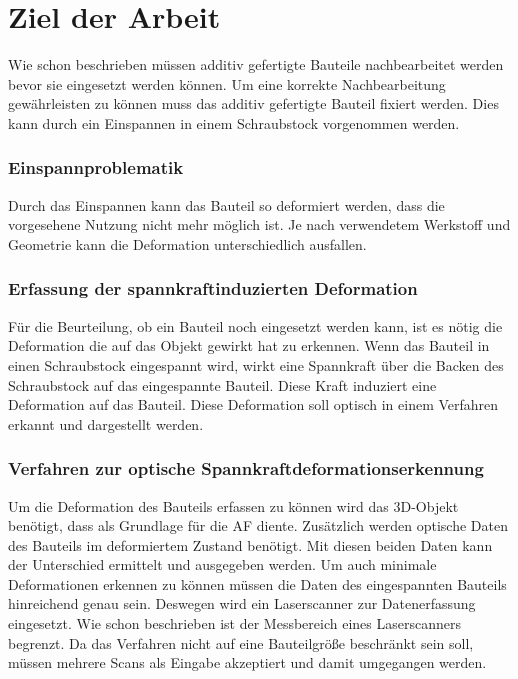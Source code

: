 

\chapter{Ziel der Arbeit}

Wie schon beschrieben müssen additiv gefertigte Bauteile nachbearbeitet werden
bevor sie eingesetzt werden können. 
Um eine korrekte Nachbearbeitung gewährleisten zu können muss das additiv 
gefertigte Bauteil fixiert werden. Dies kann durch ein Einspannen in einem 
Schraubstock vorgenommen werden. 

\subsection{Einspannproblematik}

Durch das Einspannen kann das Bauteil so deformiert werden, dass die vorgesehene Nutzung nicht mehr möglich ist. 
Je nach verwendetem Werkstoff und Geometrie kann die Deformation unterschiedlich
ausfallen. 

\subsection{Erfassung der spannkraftinduzierten Deformation}

Für die Beurteilung, ob ein Bauteil noch eingesetzt werden kann, ist es nötig die 
Deformation die auf das Objekt gewirkt hat zu erkennen. Wenn das Bauteil in einen 
Schraubstock eingespannt wird, wirkt eine Spannkraft über die Backen des Schraubstock
auf das eingespannte Bauteil. 
Diese Kraft induziert eine Deformation auf das Bauteil. Diese Deformation soll 
optisch in einem Verfahren erkannt und dargestellt werden.

\subsection{Verfahren zur optische Spannkraftdeformationserkennung}

Um die Deformation des Bauteils erfassen zu können wird das 3D-Objekt benötigt, 
dass als Grundlage für die AF diente. Zusätzlich werden optische Daten des Bauteils 
im deformiertem Zustand benötigt. Mit diesen beiden Daten kann der Unterschied 
ermittelt und ausgegeben werden.
Um auch minimale Deformationen erkennen zu können müssen die Daten des 
eingespannten Bauteils hinreichend genau sein. Deswegen wird ein Laserscanner zur 
Datenerfassung eingesetzt.
Wie schon beschrieben ist der Messbereich eines Laserscanners begrenzt. Da das 
Verfahren nicht auf eine Bauteilgröße beschränkt sein soll, müssen mehrere Scans als 
Eingabe akzeptiert und damit umgegangen werden.
